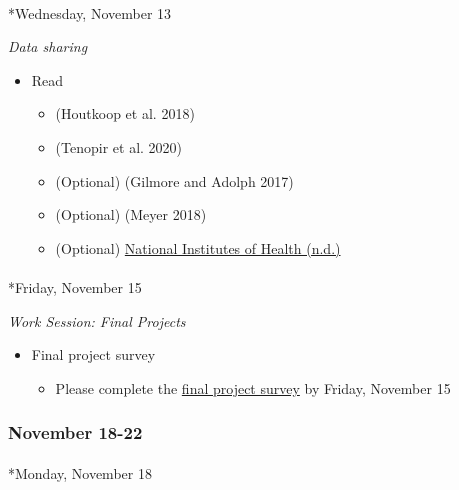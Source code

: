 \documentclass[
  letterpaper,
  DIV=11,
  numbers=noendperiod]{scrartcl}
\makeatletter
\let\oldparagraph\paragraph
\renewcommand{\paragraph}{
    \@ifstar
      \xxxParagraphStar
      \xxxParagraphNoStar
  }
\newcommand{\xxxParagraphStar}[1]{\oldparagraph*{#1}\mbox{}}
\newcommand{\xxxParagraphNoStar}[1]{\oldparagraph{#1}\mbox{}}
\providecommand{\tightlist}{%
  \setlength{\itemsep}{0pt}\setlength{\parskip}{0pt}}\usepackage{longtable,booktabs,array}
\makeatother
\begin{document}
\paragraph*{Wednesday, November 13}\label{wednesday-november-13}

\emph{Data sharing}

\begin{itemize}
\tightlist
\item
  Read

  \begin{itemize}
  \tightlist
  \item
    (Houtkoop et al. 2018)
  \item
    (Tenopir et al. 2020)
  \item
    (Optional) (Gilmore and Adolph 2017)
  \item
    (Optional) (Meyer 2018)
  \item
    (Optional)
    \href{https://grants.nih.gov/grants/guide/notice-files/NOT-OD-21-013.html}{National
    Institutes of Health (n.d.)}
  \end{itemize}
\end{itemize}

\paragraph*{Friday, November 15}\label{friday-november-15}

\emph{Work Session: Final Projects}

\begin{itemize}
\tightlist
\item
  {Final project survey}

  \begin{itemize}
  \tightlist
  \item
    Please complete the \href{https://forms.gle/vtdJ82Y7AjgU15VA9}{final
    project survey} by {Friday, November 15}
  \end{itemize}
\end{itemize}

\subsubsection*{November 18-22}\label{week-13}

\paragraph*{Monday, November 18}\label{monday-november-18}
\end{document}

